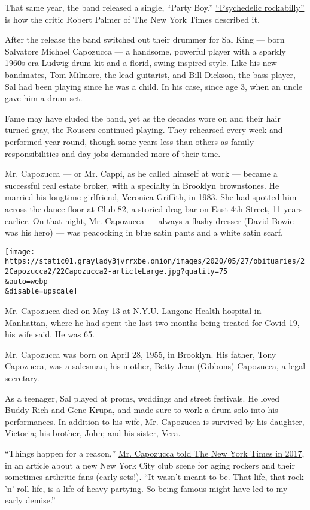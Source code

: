 That same year, the band released a single, ``Party Boy.''
\href{https://www.nytimes3xbfgragh.onion/1982/01/08/movies/new-faces-a-guide-to-fresh-talent-now-on-the-local-scene.html}{``Psychedelic
rockabilly''} is how the critic Robert Palmer of The New York Times
described it.

After the release the band switched out their drummer for Sal King ---
born Salvatore Michael Capozucca --- a handsome, powerful player with a
sparkly 1960s-era Ludwig drum kit and a florid, swing-inspired style.
Like his new bandmates, Tom Milmore, the lead guitarist, and Bill
Dickson, the bass player, Sal had been playing since he was a child. In
his case, since age 3, when an uncle gave him a drum set.

Fame may have eluded the band, yet as the decades wore on and their hair
turned gray,
\href{https://www.facebookcorewwwi.onion/TheRousersNYC/}{the Rousers}
continued playing. They rehearsed every week and performed year round,
though some years less than others as family responsibilities and day
jobs demanded more of their time.

Mr. Capozucca --- or Mr. Cappi, as he called himself at work --- became
a successful real estate broker, with a specialty in Brooklyn
brownstones. He married his longtime girlfriend, Veronica Griffith, in
1983. She had spotted him across the dance floor at Club 82, a storied
drag bar on East 4th Street, 11 years earlier. On that night, Mr.
Capozucca --- always a flashy dresser (David Bowie was his hero) --- was
peacocking in blue satin pants and a white satin scarf.

\texttt{[image: https://static01.graylady3jvrrxbe.onion/images/2020/05/27/obituaries/22Capozucca2/22Capozucca2-articleLarge.jpg?quality=75\\\&auto=webp\\\&disable=upscale]}

Mr. Capozucca died on May 13 at N.Y.U. Langone Health hospital in
Manhattan, where he had spent the last two months being treated for
Covid-19, his wife said. He was 65.

Mr. Capozucca was born on April 28, 1955, in Brooklyn. His father, Tony
Capozucca, was a salesman, his mother, Betty Jean (Gibbons) Capozucca, a
legal secretary.

As a teenager, Sal played at proms, weddings and street festivals. He
loved Buddy Rich and Gene Krupa, and made sure to work a drum solo into
his performances. In addition to his wife, Mr. Capozucca is survived by
his daughter, Victoria; his brother, John; and his sister, Vera.

``Things happen for a reason,''
\href{https://www.nytimes3xbfgragh.onion/2017/11/24/nyregion/new-york-punk-out-of-retirement.html}{Mr.
Capozucca told The New York Times in 2017}, in an article about a new
New York City club scene for aging rockers and their sometimes arthritic
fans (early sets!). ``It wasn't meant to be. That life, that rock 'n'
roll life, is a life of heavy partying. So being famous might have led
to my early demise.''

